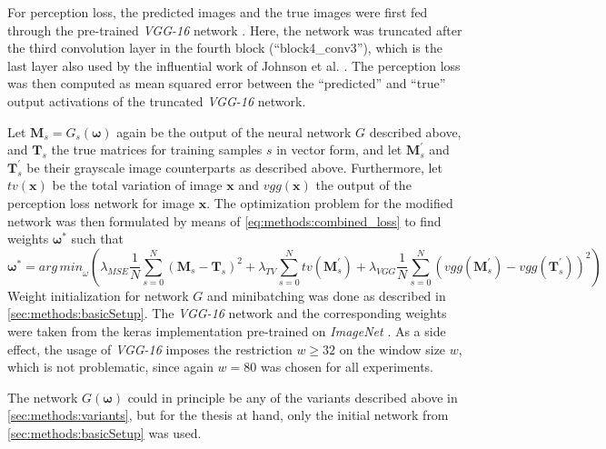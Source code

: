 For perception loss, the predicted images and the true images were first fed through the pre-trained \emph{VGG-16} network \cite{Simonyan2015}.
Here, the network was truncated after the third convolution layer in the fourth block (``block4\_conv3''), which is the last layer also used by the influential work of Johnson et al. \cite{Johnson2016}.
The perception loss was then computed as mean squared error between the ``predicted'' and ``true'' output activations of the truncated \emph{VGG-16} network.

Let $\mathbf{M}_s=G_s(\bm{\omega})$ again be the output of the neural network $G$ described above, and $\mathbf{T}_s$ the true matrices for training samples $s$ in vector form,
and let $\mathbf{M}^\prime_s$ and $\mathbf{T}^\prime_s$ be their grayscale image counterparts as described above.
Furthermore, let $\mathit{tv}(\mathbf{x})$ be the total variation of image $\mathbf{x}$ and $\mathit{vgg}(\mathbf{x})$ the output of the perception loss network for image $\mathbf{x}$.
The optimization problem for the modified network was then formulated by means of \cref{eq:methods:combined_loss} to find weights $\bm{\omega}^*$ such that
\begin{equation}
 \bm{\omega}^* = \mathit{arg\,min}_\omega (  \lambda_\mathit{MSE} \frac{1}{N} \sum_{s=0}^N (\mathbf{M}_s - \mathbf{T}_s)^2 
                                                     + \lambda_\mathit{TV} \sum_{s=0}^N \mathit{tv}( \mathbf{M}^\prime_s) 
                                                     + \lambda_\mathit{VGG} \frac{1}{N} \sum_{s=0}^N (\mathit{vgg}(\mathbf{M}^\prime_s) - \mathit{vgg}(\mathbf{T}^\prime_s))^2 ) \label{eq:methods:combined_loss}
\end{equation}
Weight initialization for network $G$ and minibatching was done as described in \cref{sec:methods:basicSetup}.
The \emph{VGG-16} network and the corresponding weights were taken from the keras implementation pre-trained on \emph{ImageNet} \cite{deng2009}.
As a side effect, the usage of \emph{VGG-16} imposes the restriction $w \geq 32$ on the window size $w$, which is not problematic, since again $w=80$ was chosen for all experiments.

The network $G(\bm{\omega})$ could in principle be any of the variants described above in \cref{sec:methods:variants},
but for the thesis at hand, only the initial network from \cref{sec:methods:basicSetup} was used.

